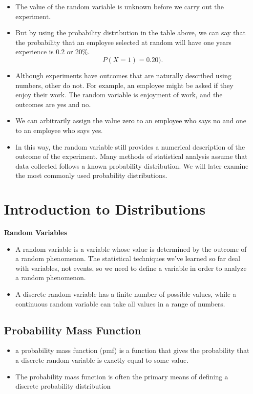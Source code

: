 \documentclass[]{report}
\begin{document}
{\begin{itemize}
\item The value of the random variable is unknown before we carry out the experiment.
\item But by using the probability distribution in the table above, we can say that the probability that an employee selected at random will have one years experience is 0.2 or 20\%. \[P(X = 1) = 0.20). \]
\item Although experiments have outcomes that are naturally described using numbers, other do not. For example, an employee might be asked if they enjoy their work. The random variable is enjoyment of work, and the outcomes are yes and no.

\item We can arbitrarily assign the value zero to an employee who says no and one to an employee who says yes.

\item In this way, the random variable still provides a numerical description of the outcome of the experiment.
Many methods of statistical analysis assume that data collected follows a known probability distribution. We will later examine the most commonly used probability distributions.

\end{itemize}



\section{Introduction to Distributions}

\noindent \textbf{Random Variables}
\begin{itemize}
\item A random variable is a variable whose value is determined by the outcome of a random phenomenon.
The statistical techniques we've learned so far deal with variables, not events, so we need to define a
variable in order to analyze a random phenomenon.
\item A discrete random variable has a finite number of possible values, while a continuous random variable
can take all values in a range of numbers.
\end{itemize}





\subsection{Probability Mass Function}
\begin{itemize} 
\item  a probability mass function (pmf) is a function that gives the probability that a discrete random variable is exactly equal to some value. 
\item  The probability mass function is often the primary means of defining a discrete probability distribution 
\end{itemize}


}
\end{document}
